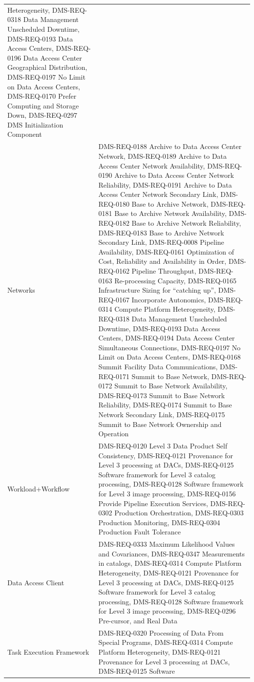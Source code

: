 \documentclass[DM,lsstdraft,toc]{lsstdoc}
\begin{document}
\begin{longtable}[]{@{}ll@{}}
Heterogeneity, DMS-REQ-0318 Data Management Unscheduled Downtime,
DMS-REQ-0193 Data Access Centers, DMS-REQ-0196 Data Access Center
Geographical Distribution, DMS-REQ-0197 No Limit on Data Access Centers,
DMS-REQ-0170 Prefer Computing and Storage Down, DMS-REQ-0297 DMS
Initialization Component\tabularnewline
Networks & DMS-REQ-0188 Archive to Data Access Center Network,
DMS-REQ-0189 Archive to Data Access Center Network Availability,
DMS-REQ-0190 Archive to Data Access Center Network Reliability,
DMS-REQ-0191 Archive to Data Access Center Network Secondary Link,
DMS-REQ-0180 Base to Archive Network, DMS-REQ-0181 Base to Archive
Network Availability, DMS-REQ-0182 Base to Archive Network Reliability,
DMS-REQ-0183 Base to Archive Network Secondary Link, DMS-REQ-0008
Pipeline Availability, DMS-REQ-0161 Optimization of Cost, Reliability
and Availability in Order, DMS-REQ-0162 Pipeline Throughput,
DMS-REQ-0163 Re-processing Capacity, DMS-REQ-0165 Infrastructure Sizing
for ``catching up'', DMS-REQ-0167 Incorporate Autonomics, DMS-REQ-0314
Compute Platform Heterogeneity, DMS-REQ-0318 Data Management Unscheduled
Downtime, DMS-REQ-0193 Data Access Centers, DMS-REQ-0194 Data Access
Center Simultaneous Connections, DMS-REQ-0197 No Limit on Data Access
Centers, DMS-REQ-0168 Summit Facility Data Communications, DMS-REQ-0171
Summit to Base Network, DMS-REQ-0172 Summit to Base Network
Availability, DMS-REQ-0173 Summit to Base Network Reliability,
DMS-REQ-0174 Summit to Base Network Secondary Link, DMS-REQ-0175 Summit
to Base Network Ownership and Operation\tabularnewline
Workload+Workflow & DMS-REQ-0120 Level 3 Data Product Self Consistency,
DMS-REQ-0121 Provenance for Level 3 processing at DACs, DMS-REQ-0125
Software framework for Level 3 catalog processing, DMS-REQ-0128 Software
framework for Level 3 image processing, DMS-REQ-0156 Provide Pipeline
Execution Services, DMS-REQ-0302 Production Orchestration, DMS-REQ-0303
Production Monitoring, DMS-REQ-0304 Production Fault
Tolerance\tabularnewline
Data Access Client & DMS-REQ-0333 Maximum Likelihood Values and
Covariances, DMS-REQ-0347 Measurements in catalogs, DMS-REQ-0314 Compute
Platform Heterogeneity, DMS-REQ-0121 Provenance for Level 3 processing
at DACs, DMS-REQ-0125 Software framework for Level 3 catalog processing,
DMS-REQ-0128 Software framework for Level 3 image processing,
DMS-REQ-0296 Pre-cursor, and Real Data\tabularnewline
Task Execution Framework & DMS-REQ-0320 Processing of Data From Special
Programs, DMS-REQ-0314 Compute Platform Heterogeneity, DMS-REQ-0121
Provenance for Level 3 processing at DACs, DMS-REQ-0125 Software

\end{longtable}
\end{document}
